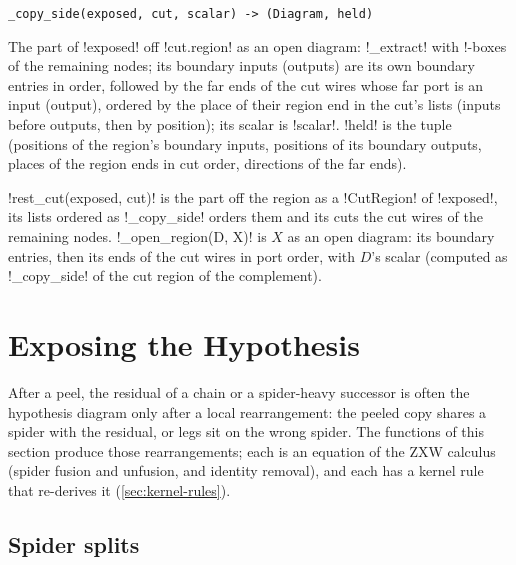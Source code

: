\begin{signature}
\texttt{\_\allowbreak{}copy\_\allowbreak{}side(\allowbreak{}exposed,\allowbreak{} cut,\allowbreak{} scalar) -> (\allowbreak{}Diagram,\allowbreak{} held)}

The part of \code!exposed! off \code!cut.region! as an open diagram: \py!_extract! with !-boxes of the remaining nodes; its boundary inputs (outputs) are its own boundary entries in order, followed by the far ends of the cut wires whose far port is an input (output), ordered by the place of their region end in the cut's lists (inputs before outputs, then by position); its scalar is \code!scalar!. \code!held! is the tuple (positions of the region's boundary inputs, positions of its boundary outputs, places of the region ends in cut order, directions of the far ends).
\end{signature}

\py!rest_cut(exposed, cut)! is the part off the region as a \py!CutRegion! of \code!exposed!, its lists ordered as \py!_copy_side! orders them and its cuts the cut wires of the remaining nodes. \py!_open_region(D, X)! is $X$ as an open diagram: its boundary entries, then its ends of the cut wires in port order, with $D$'s scalar (computed as \py!_copy_side! of the cut region of the complement).

\section{Exposing the Hypothesis}\label{sec:kernel-expose}

After a peel, the residual of a chain or a spider-heavy successor is often the hypothesis diagram only after a local rearrangement: the peeled copy shares a spider with the residual, or legs sit on the wrong spider. The functions of this section produce those rearrangements; each is an equation of the ZXW calculus (spider fusion and unfusion, and identity removal), and each has a kernel rule that re-derives it (\cref{sec:kernel-rules}).

\subsection{Spider splits}

